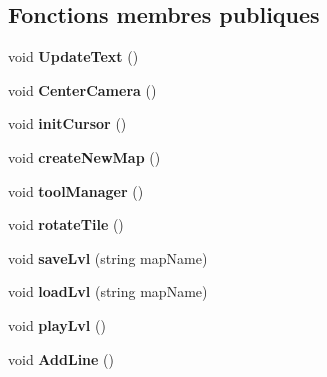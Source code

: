 \subsection*{Fonctions membres publiques}
\begin{DoxyCompactItemize}
\item 
\mbox{\label{class_tile_editor_a388e1191821f07e9486e26ac5dd43dac}} 
void {\bfseries Update\+Text} ()
\item 
\mbox{\label{class_tile_editor_aac23f708649956dad2a2d143482325c4}} 
void {\bfseries Center\+Camera} ()
\item 
\mbox{\label{class_tile_editor_a6e21963247a98b316944a7f184156fc6}} 
void {\bfseries init\+Cursor} ()
\item 
\mbox{\label{class_tile_editor_a4cc6ee8cc3ebf875763b9ea172910b2d}} 
void {\bfseries create\+New\+Map} ()
\item 
\mbox{\label{class_tile_editor_a5a9a1b757f4f2729bef6551de496dbce}} 
void {\bfseries tool\+Manager} ()
\item 
\mbox{\label{class_tile_editor_aa864605629d3be9ff0fe064ed0214de1}} 
void {\bfseries rotate\+Tile} ()
\item 
\mbox{\label{class_tile_editor_a249e6046f5ffa05e1d38c3e7323cb5ba}} 
void {\bfseries save\+Lvl} (string map\+Name)
\item 
\mbox{\label{class_tile_editor_a4b65f9f7c78f28b24ce397bec4b0c5cb}} 
void {\bfseries load\+Lvl} (string map\+Name)
\item 
\mbox{\label{class_tile_editor_a187c8ed997a91cd17b4179b1ae836964}} 
void {\bfseries play\+Lvl} ()
\item 
\mbox{\label{class_tile_editor_a90f35fb468749184ebab36e3aa3efc2f}} 
void {\bfseries Add\+Line} ()
\item 
\mbox{\label{class_tile_editor_af516c78b0d4d5241f681fe0aa90cd8b1}} 

\end{DoxyCompactItemize}

